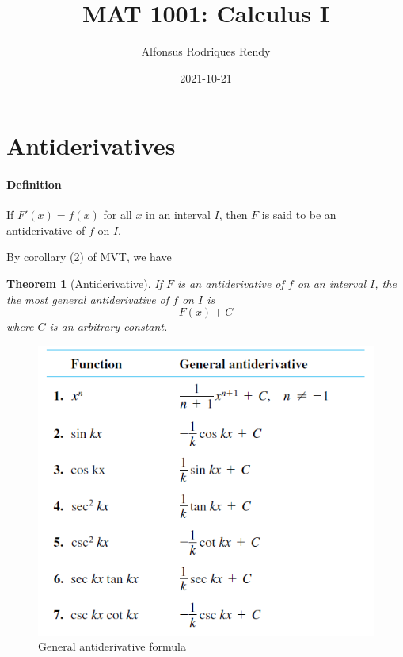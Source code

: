 \documentclass[12pt]{article}
\title{MAT 1001: Calculus I}
\author{Alfonsus Rodriques Rendy}
\date{2021-10-21}
\newtheorem{theorem}{Theorem}
\begin{document}
\begin{center}
    \hspace*{-0.5cm}
\end{center}

\section{Antiderivatives}
\paragraph{Definition}
If $F'(x) = f(x)$ for all $x$ in an interval $I$, then $F$ is said to be an antiderivative of $f$ on $I$. 

\noindent
By corollary (2) of MVT, we have
\begin{theorem}[Antiderivative]
    If $F$ is an antiderivative of $f$ on an interval $I$, the the most general antiderivative of $f$ on $I$ is 
    \[
        F(x) + C
    \]
    where $C$ is an arbitrary constant.
\end{theorem}

\begin{figure}[h!]
     \centering
     \includegraphics[width = 0.4\linewidth]{Images/general antiderivative.png}
     \caption{General antiderivative formula}
\end{figure}
\end{document}
